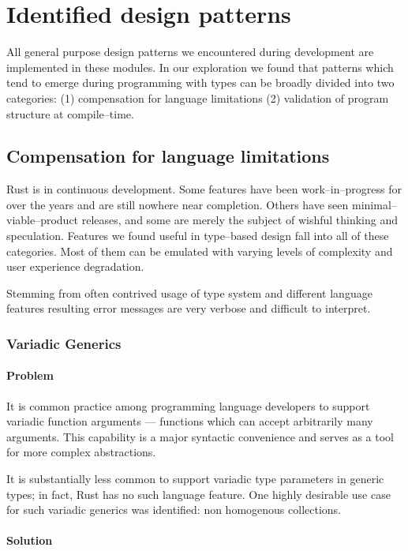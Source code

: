 \section{Identified design patterns}

All general purpose design patterns we encountered during development are implemented in these modules.
In our exploration we found that patterns which tend to emerge during programming with types can be broadly divided into two categories: (1) compensation for language limitations (2) validation of program structure at compile--time.

\subsection{Compensation for language limitations}

Rust is in continuous development. 
Some features have been work--in--progress for over the years and are still nowhere near completion. 
Others have seen minimal--viable--product releases, and some are merely the subject of wishful thinking and speculation. 
Features we found useful in type--based design fall into all of these categories. 
Most of them can be emulated with varying levels of complexity and user experience degradation.

Stemming from often contrived usage of type system and different language features
resulting error messages are very verbose and difficult to interpret.

\subsubsection{Variadic Generics}

\paragraph{Problem}

It is common practice among programming language developers to support variadic function arguments --- functions which can accept arbitrarily many arguments.
This capability is a major syntactic convenience and serves as a tool for more complex abstractions.

It is substantially less common to support variadic type parameters in generic types; in fact, Rust has no such language feature.
One highly desirable use case for such variadic generics was identified: non homogenous collections. 

\paragraph{Solution}

